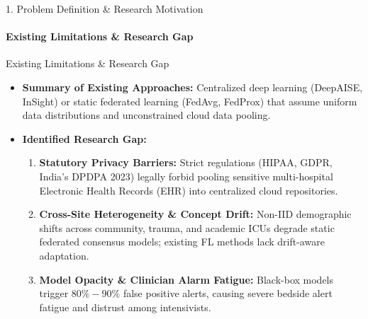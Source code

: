 \documentclass[aspectratio=169, 11pt]{beamer}
\begin{document}
\begin{frame}{1. Problem Definition \& Research Motivation}
    \framesubtitle{Existing Limitations \& Research Gap}
    \begin{block}{Existing Limitations \& Research Gap}
        \footnotesize
        \begin{itemize}
            \item \textbf{Summary of Existing Approaches:} Centralized deep learning (DeepAISE, InSight) or static federated learning (FedAvg, FedProx) that assume uniform data distributions and unconstrained cloud data pooling.
            \item \textbf{Identified Research Gap:}
            \begin{enumerate}
                \scriptsize
                \item \textbf{Statutory Privacy Barriers:} Strict regulations (HIPAA, GDPR, India's DPDPA 2023) legally forbid pooling sensitive multi-hospital Electronic Health Records (EHR) into centralized cloud repositories.
                \item \textbf{Cross-Site Heterogeneity \& Concept Drift:} Non-IID demographic shifts across community, trauma, and academic ICUs degrade static federated consensus models; existing FL methods lack drift-aware adaptation.
                \item \textbf{Model Opacity \& Clinician Alarm Fatigue:} Black-box models trigger $80\%-90\%$ false positive alerts, causing severe bedside alert fatigue and distrust among intensivists.
            \end{enumerate}
        \end{itemize}
    \end{block}
\end{frame}
\end{document}
